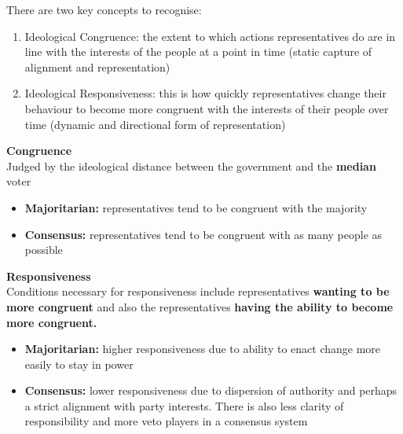 \documentclass[12pt, letterpaper]{article}
\begin{document}
There are two key concepts to recognise:
\begin{enumerate}
	\item Ideological Congruence: the extent to which actions representatives do are in line with the interests of the people at a point in time (static capture of alignment and representation)
	\item Ideological Responsiveness: this is how quickly representatives change their behaviour to become more congruent with the interests of their people over time (dynamic and directional form of representation)
\end{enumerate}
\textbf{Congruence}\\
Judged by the ideological distance between the government and the \textbf{median} voter
\begin{itemize}
	\item \textbf{Majoritarian:} representatives tend to be congruent with the majority
	\item \textbf{Consensus:} representatives tend to be congruent with as many people as possible
\end{itemize}
\textbf{Responsiveness}\\
Conditions necessary for responsiveness include representatives \textbf{wanting to be more congruent} and also the representatives \textbf{having the ability to become more congruent.}
\begin{itemize}
	\item \textbf{Majoritarian:} higher responsiveness due to ability to enact change more easily to stay in power
	\item \textbf{Consensus:} lower responsiveness due to dispersion of authority and perhaps a strict alignment with party interests. There is also less clarity of responsibility and more veto players in a consensus system
\end{itemize}
\end{document}

